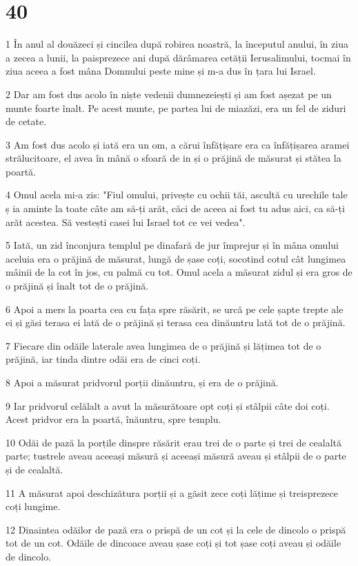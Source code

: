 \chapter{40}

\par 1 În anul al douăzeci și cincilea după robirea noastră, la începutul anului, în ziua a zecea a lunii, la paisprezece ani după dărâmarea cetății Ierusalimului, tocmai în ziua aceea a fost mâna Domnului peste mine și m-a dus în țara lui Israel.
\par 2 Dar am fost dus acolo în niște vedenii dumnezeiești și am fost așezat pe un munte foarte înalt. Pe acest munte, pe partea lui de miazăzi, era un fel de ziduri de cetate.
\par 3 Am fost dus acolo și iată era un om, a cărui înfățișare era ca înfățișarea aramei strălucitoare, el avea în mână o sfoară de in și o prăjină de măsurat și stătea la poartă.
\par 4 Omul acela mi-a zis: "Fiul omului, privește cu ochii tăi, ascultă cu urechile tale ș ia aminte la toate câte am să-ți arăt, căci de aceea ai fost tu adus aici, ca să-ți arăt acestea. Să vestești casei lui Israel tot ce vei vedea".
\par 5 Iată, un zid înconjura templul pe dinafară de jur împrejur și în mâna omului aceluia era o prăjină de măsurat, lungă de șase coți, socotind cotul cât lungimea mâinii de la cot în jos, cu palmă cu tot. Omul acela a măsurat zidul și era gros de o prăjină și înalt tot de o prăjină.
\par 6 Apoi a mers la poarta cea cu fața spre răsărit, se urcă pe cele șapte trepte ale ei și găsi terasa ei lată de o prăjină și terasa cea dinăuntru lată tot de o prăjină.
\par 7 Fiecare din odăile laterale avea lungimea de o prăjină și lățimea tot de o prăjină, iar tinda dintre odăi era de cinci coți.
\par 8 Apoi a măsurat pridvorul porții dinăuntru, și era de o prăjină.
\par 9 Iar pridvorul celălalt a avut la măsurătoare opt coți și stâlpii câte doi coți. Acest pridvor era la poartă, înăuntru, spre templu.
\par 10 Odăi de pază la porțile dinspre răsărit erau trei de o parte și trei de cealaltă parte; tustrele aveau aceeași măsură și aceeași măsură aveau și stâlpii de o parte și de cealaltă.
\par 11 A măsurat apoi deschizătura porții și a găsit zece coți lățime și treisprezece coți lungime.
\par 12 Dinaintea odăilor de pază era o prispă de un cot și la cele de dincolo o prispă tot de un cot. Odăile de dincoace aveau șase coți și tot șase coți aveau și odăile de dincolo.
